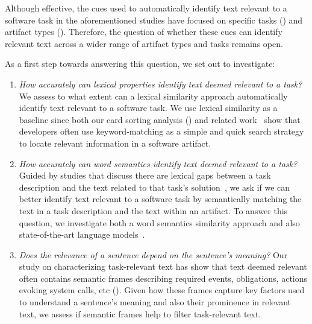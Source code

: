 Although effective, the cues used to automatically identify text relevant to a software task in the aforementioned studies have focused on specific tasks () and artifact types ().
Therefore, the question of whether these cues can identify relevant text across a wider range of artifact types and tasks remains open. 



As a first step towards answering this question, we set out to investigate:


\begin{enumerate}
    \item \textit{How accurately can lexical properties identify text deemed relevant to a task?}
    We assess to what extent can a lexical similarity approach automatically identify text relevant to a software task.
    We use lexical similarity as a baseline since both our card sorting analysis () and related work~\cite{Ko2006a, Freund2015} show
    that developers often use keyword-matching as a simple and quick search strategy to locate relevant information in a software artifact.


    \item \textit{How accurately can word semantics identify text deemed relevant to a task?}
    Guided by studies that discuss there are lexical gaps between a task description and the text related to that task's solution~\cite{silva2019, Huang2018, Ye2016},
    we ask if we can better identify text relevant to a software task by semantically matching the text in a task description and the text within an artifact.
    To answer this question, we investigate both a word semantics similarity approach and also state-of-the-art language models~\cite{Devlin2018Bert}.

    
    \item \textit{Does the relevance of a sentence depend on the sentence's meaning?}
    Our study on characterizing task-relevant text has show that text deemed relevant often contains semantic frames describing 
     required events, obligations, actions evoking system calls, etc ().
    Given how these frames capture key factors used to understand a sentence's meaning
    and also their prominence in relevant text, 
    we assess if semantic frames help to filter task-relevant text.
\end{enumerate}








